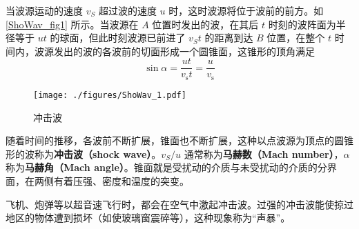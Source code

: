 
当波源运动的速度 $v_S$ 超过波的速度 $u $ 时，这时波源将位于波前的前方。如\autoref{ShoWav_fig1} 所示。当波源在 $A $ 位置时发出的波，在其后 $t $ 时刻的波阵面为半径等于 $ut $ 的球面，但此时刻波源已前进了 $v_St$ 的距离到达 $B $ 位置，在整个 $t $ 时间内，波源发出的波的各波前的切面形成一个圆锥面，这锥形的顶角满足
\begin{equation}
\sin \alpha=\frac{u t}{v_{\mathrm{s}} t}=\frac{u}{v_{\mathrm{s}}}
\end{equation}
\begin{figure}[ht]
\centering
\texttt{[image: ./figures/ShoWav\_1.pdf]}
\caption{冲击波} \label{ShoWav_fig1}
\end{figure}
随着时间的推移，各波前不断扩展，锥面也不断扩展，这种以点波源为顶点的圆锥形的波称为\textbf{冲击波（shock wave）}。$v_S/u$ 通常称为\textbf{马赫数（Mach number）}，$\alpha$ 称为\textbf{马赫角（Mach angle）}。锥面就是受扰动的介质与未受扰动的介质的分界面，在两侧有着压强、密度和温度的突变。

飞机、炮弹等以超音速飞行时，都会在空气中激起冲击波。过强的冲击波能使掠过地区的物体遭到损坏（如使玻璃窗震碎等），这种现象称为“声暴”。
